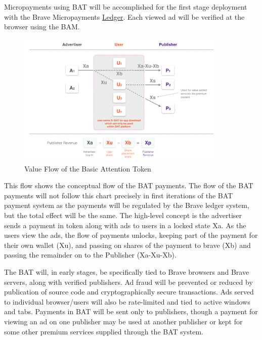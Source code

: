 \documentclass[11pt]{article}
\begin{document}
Micropayments using BAT will be accomplished for the first stage deployment with the Brave Micropayments \href{https://github.com/brave/ledger}{Ledger}. Each viewed ad will be verified at the browser using the BAM. 


\begin{figure}
\begin{center}
\includegraphics[width=0.9\textwidth]{BAT_tokentech_diagram.png}
\caption{Value Flow of the Basic Attention Token}
\end{center}
\end{figure}



This flow shows the conceptual flow of the BAT payments. The flow of the BAT payments will not follow this chart precisely in first iterations of the BAT payment system as the payments will be regulated by the Brave ledger system, but the total effect will be the same. The high-level concept is the advertiser sends a payment in token along with ads to users in a locked state Xa. As the users view the ads, the flow of payments unlocks, keeping part of the payment for their own wallet (Xu), and passing on shares of the payment to brave (Xb) and passing the remainder on to the Publisher (Xa-Xu-Xb).  

The BAT will, in early stages, be specifically tied to Brave browsers and Brave servers, along with verified publishers. Ad fraud will be prevented or reduced by publication of source code and cryptographically secure transactions. Ads served to individual browser/users will also be rate-limited and tied to active windows and tabs. Payments in BAT will be sent only to publishers, though a payment for viewing an ad on one publisher may be used at another publisher or kept for some other premium services supplied through the BAT system.
\end{document}
